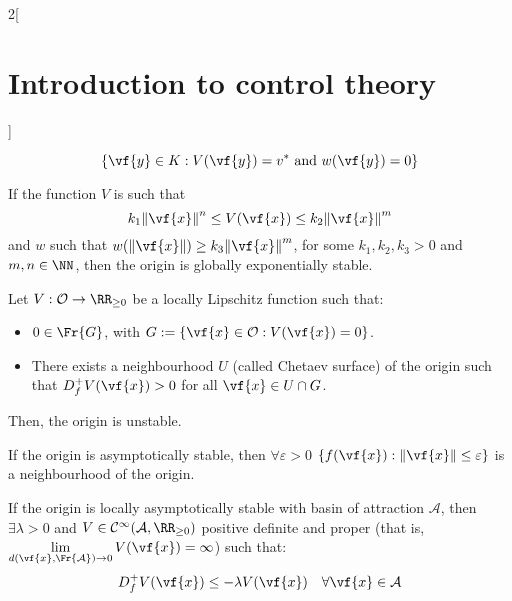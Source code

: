 \documentclass[../../../main_math.tex]{subfiles}
\begin{document}
\begin{multicols}{2}[\section{Introduction to control theory}]
\begin{theorem}
    $$
      \{\vf{y}\in K: V(\vf{y})=v^*\text{ and }w(\vf{y})=0\}
    $$
  \end{theorem}
  \begin{remark}
    If the function $V$ is such that $$
      k_1\norm{\vf{x}}^n \leq V(\vf{x}) \leq k_2\norm{\vf{x}}^m
    $$
    and $w$ such that $w(\norm{\vf{x}})\geq k_3\norm{\vf{x}}^m$, for some $k_1,k_2,k_3>0$ and $m,n\in\NN$, then the origin is globally exponentially stable.
  \end{remark}
  \begin{theorem}
    Let $V:\mathcal{O}\to \RR_{\geq 0}$ be a locally Lipschitz function such that:
    \begin{itemize}
      \item $0\in \Fr{G}$, with $G:=\{\vf{x}\in \mathcal{O}: V(\vf{x})=0\}$.
      \item There exists a neighbourhood $U$ (called Chetaev surface) of the origin such that $D_f^+V(\vf{x})>0$ for all $\vf{x}\in U\cap G$.
    \end{itemize}
    Then, the origin is unstable.
  \end{theorem}
  \begin{theorem}
    If the origin is asymptotically stable, then $\forall\varepsilon>0$ $\{f(\vf{x}): \norm{\vf{x}}\leq \varepsilon\}$ is a neighbourhood of the origin.
  \end{theorem}
  \begin{theorem}
    If the origin is locally asymptotically stable with basin of attraction $\mathcal{A}$, then $\exists \lambda>0$ and $V\in \mathcal{C}^\infty(\mathcal{A},\RR_{\geq 0})$ positive definite and proper (that is, $\displaystyle \lim_{d(\vf{x}, \Fr{\mathcal{A}})\to 0}V(\vf{x})=\infty$) such that:
    $$
      D_f^+V(\vf{x})\leq -\lambda V(\vf{x})\quad\forall \vf{x}\in \mathcal{A}
    $$
  \end{theorem}

\end{multicols}
\end{document}
